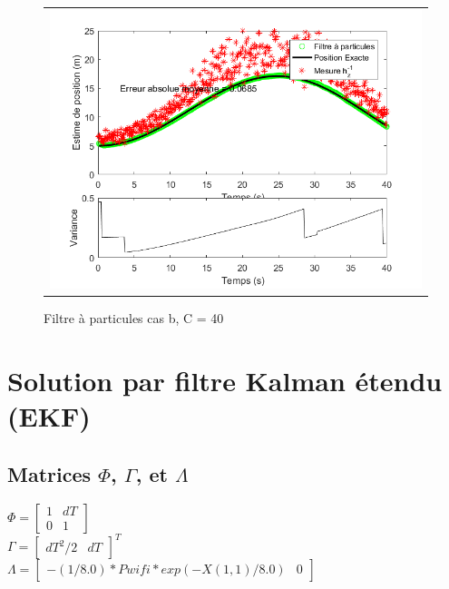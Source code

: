 \documentclass[11pt]{article}		%
\begin{document}
\vspace{-0.3in}
\label{FP}
\begin{figure}[ht]
 \begin{center}
  \begin{tabular}{c}
    \includegraphics[width=1.0\textwidth]{fp2.png} 
  \end{tabular}
 \end{center}
 \vspace{-0.3in}
 \caption{Filtre à particules cas b, C = 40}
 \label{FP2}
\end{figure}

\newpage
\section{Solution par filtre Kalman étendu (EKF)}
\label{EKF}
\subsection{Matrices $\Phi$, $\Gamma$, et $\Lambda$}

\noindent $\Phi = \begin{bmatrix}1 & dT\\0 & 1\end{bmatrix}$ \\

\noindent $\Gamma = \begin{bmatrix}dT^2/2 & dT\end{bmatrix}^T$ \\

\noindent $\Lambda = \begin{bmatrix}-(1/8.0)*Pwifi*exp(-X(1,1)/8.0) & 0\end{bmatrix}$ \\
\end{document}
